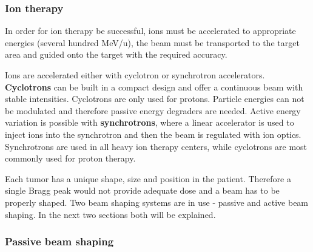 \subsubsection{Ion therapy}

In order for ion therapy be successful, ions must be accelerated to appropriate energies (several hundred MeV/u), the beam must be transported to the target area and guided
onto the target with the required accuracy.






Ions are accelerated either with cyclotron or synchrotron accelerators. \textbf{Cyclotrons} can be built in a compact design and offer a continuous beam with
stable intensities. Cyclotrons are only used for protons. Particle energies can not be modulated and therefore passive energy degraders are needed. Active energy variation is possible with \textbf{synchrotrons}, where a linear
accelerator is used to inject ions into the synchrotron and then the beam is regulated with ion optics. Synchrotrons are used in all heavy ion therapy centers, while cyclotrons are most
commonly used for proton therapy.

Each tumor has a unique shape, size and position in the patient. Therefore a single Bragg peak would not provide adequate dose and a beam has to be properly shaped. Two beam shaping systems
are in use - passive and active beam shaping. In the next two sections both will be explained.
\newpage

\subsubsection{Passive beam shaping}
\label{Sec::Passive}

